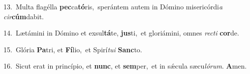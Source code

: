 {\numbfont\textcolor{\numbcolor}{13.}}~Multa flagélla \textbf{pec}\-ca\-\textbf{tó}\-ris,~\star sperántem autem in Dómino misericórdi\textit{a} \textit{cir}\-\textbf{cúm}dabit.\par
{\numbfont\textcolor{\numbcolor}{14.}}~Lætámini in Dómino et exsul\-\textbf{tá}\-te, \textbf{jus}\-ti,~\star et gloriámini, omnes \textit{rec}\-\textit{ti} \textbf{cor}\-de.\par
{\numbfont\textcolor{\numbcolor}{15.}}~Glória \textbf{Pa}\-tri, et \textbf{Fí}\-lio,~\star et Spirí\-\textit{tu}\-\textit{i} \textbf{Sanc}\-to.\par
{\numbfont\textcolor{\numbcolor}{16.}}~Sicut erat in princípio, et \textbf{nunc}\-, et \textbf{sem}\-per,~\star et in sǽcula sæcu\-\textit{ló}\-\textit{rum}. \textbf{A}\-men.\par
